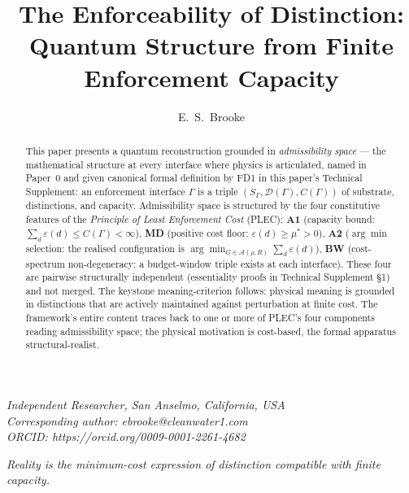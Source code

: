 \documentclass[11pt]{article}
\title{The Enforceability of Distinction: Quantum Structure from Finite Enforcement Capacity}
\author{E.\ S.\ Brooke}
\date{}
\theoremstyle{remark}
\begin{document}
\maketitle

\noindent\textit{Independent Researcher, San Anselmo, California, USA}\\
\textit{Corresponding author: ebrooke@cleanwater1.com}\\
\textit{ORCID: https://orcid.org/0009-0001-2261-4682}

\bigskip

\begin{center}
\textit{Reality is the minimum-cost expression of distinction compatible with finite capacity.}
\end{center}

\bigskip

\begin{abstract}
This paper presents a quantum reconstruction grounded in \emph{admissibility space} --- the mathematical structure at every interface where physics is articulated, named in Paper~0 and given canonical formal definition by FD1 in this paper's Technical Supplement: an enforcement interface $\Gamma$ is a triple $(S_\Gamma, \mathcal{D}(\Gamma), C(\Gamma))$ of substrate, distinctions, and capacity.  Admissibility space is structured by the four constitutive features of the \emph{Principle of Least Enforcement Cost} (PLEC): \textbf{A1} (capacity bound: $\sum_d \varepsilon(d) \le C(\Gamma) < \infty$), \textbf{MD} (positive cost floor: $\varepsilon(d) \ge \mu^* > 0$), \textbf{A2} ($\arg\min$ selection: the realised configuration is $\arg\min_{G \in \mathcal{A}(\rho, R)} \sum_d \varepsilon(d)$), \textbf{BW} (cost-spectrum non-degeneracy: a budget-window triple exists at each interface).  These four are pairwise structurally independent (essentiality proofs in Technical Supplement \S1) and not merged.  The keystone meaning-criterion follows: physical meaning is grounded in distinctions that are actively maintained against perturbation at finite cost.  The framework's entire content traces back to one or more of PLEC's four components reading admissibility space; the physical motivation is cost-based, the formal apparatus structural-realist.


\end{abstract}
\end{document}

